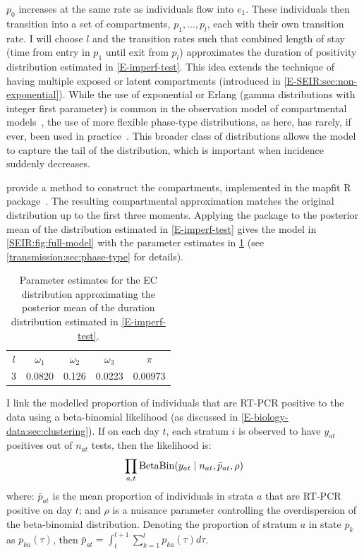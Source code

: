 \documentclass[thesis.tex]{subfiles}
\begin{document}
$p_0$ increases at the same rate as individuals flow into $e_1$.
These individuals then transition into a set of compartments, $p_1, \dots, p_l$, each with their own transition rate.
I will choose $l$ and the transition rates such that combined length of stay (\ie time from entry in $p_1$ until exit from $p_l$) approximates the duration of positivity distribution estimated in \cref{E-imperf-test}.
This idea extends the technique of having multiple exposed or latent compartments (introduced in \cref{E-SEIR:sec:non-exponential}).
While the use of exponential or Erlang (gamma distributions with integer first parameter) is common in the observation model of compartmental models~\autocite[e.g.][]{overtonEpiBeds}, the use of more flexible phase-type distributions, as here, has rarely, if ever, been used in practice~\autocite{hurtadoGLCT}.
This broader class of distributions allows the model to capture the tail of the distribution, which is important when incidence suddenly decreases.

\Textcite{osogamiClosed} provide a method to construct the compartments, implemented in the mapfit R package~\autocite{mapfit}. 
The resulting compartmental approximation matches the original distribution up to the first three moments.
Applying the package to the posterior mean of the distribution estimated in \cref{E-imperf-test} gives the model in \cref{SEIR:fig:full-model} with the parameter estimates in \cref{SEIR:table:ec-params} (see \cref{transmission:sec:phase-type} for details).
\begin{table}
    \centering
    \begin{tabular}{c c c c c}
        $l$ & $\omega_1$ & $\omega_{2}$ & $\omega_{3}$ & $\pi$ \\
        3 & 0.0820 & 0.126 & 0.0223 & 0.00973  \\
    \end{tabular}
    \caption{Parameter estimates for the EC distribution approximating the posterior mean of the duration distribution estimated in \cref{E-imperf-test}.}
    \label{SEIR:table:ec-params}
\end{table}

I link the modelled proportion of individuals that are RT-PCR positive to the data using a beta-binomial likelihood (as discussed in \cref{E-biology-data:sec:clustering}).
If on each day $t$, each stratum $i$ is observed to have $y_{at}$ positives out of $n_{at}$ tests, then the likelihood is:
\begin{align}
    \prod_{a,t} \operatorname{BetaBin} (y_{at} \mid n_{at}, \bar{p}_{at}, \rho)
    \label{SEIR:eq:likelihood}
\end{align}
where: $\bar{p}_{at}$ is the mean proportion of individuals in strata $a$ that are RT-PCR positive on day $t$; and $\rho$ is a nuisance parameter controlling the overdispersion of the beta-binomial distribution.
Denoting the proportion of stratum $a$ in state $p_k$ as $p_{ka}(\tau)$, then $\bar{p}_{at} = \int_{t}^{t+1} \sum_{k=1}^l p_{ka}(\tau) d\tau$.
\end{document}
